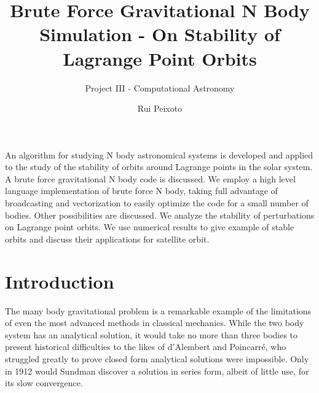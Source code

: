 \documentclass{aa}
\begin{document}
 

   \title{Brute Force Gravitational N Body Simulation - On Stability of Lagrange
   Point Orbits}
   
   \subtitle{Project III - Computational Astronomy}

   \author{Rui Peixoto}



 
  \abstract
   {}
   {An algorithm for studying N body astronomical systems is developed and
     applied to the study of the stability of orbits around Lagrange points in
     the solar system.}
   {A brute force gravitational N body code is discussed. We employ a high
     level language implementation of brute force N body, taking full advantage
     of broadcasting and vectorization to easily optimize the code for a small
     number of bodies. Other possibilities are discussed.}
   {We analyze the stability of perturbations on Lagrange point orbits. We use
     numerical results to give example of stable orbits and discuss their
     applications for satellite orbit.}
   {}

   \maketitle
%

\section{Introduction}

The many body gravitational problem is a remarkable example of the limitations
of even the most advanced methods in classical mechanics. While the two body
system has an analytical solution, it would take no more than three bodies to present
historical difficulties to the likes of d'Alembert and Poincarré, who struggled
greatly to prove closed form analytical solutions were impossible. Only in 1912
would Sundman discover a solution in series form, albeit of little use, for its
slow convergence.
\end{document}
